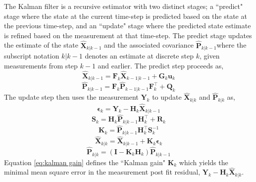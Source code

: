 \documentclass[fleqn,usenatbib,useAMS]{mnras}
\begin{document}
The Kalman filter is a recursive estimator with two distinct stages; a ``predict" stage where the state at the current time-step is predicted based on the state at the previous time-step, and an ``update" stage where the predicted state estimate is refined based on the measurement at that time-step. The predict stage updates the estimate of the state $\hat{\boldsymbol{X}}_{k|k-1}$ and the associated covariance $\hat{\boldsymbol{P}}_{k|k-1}$where the subscript notation ${k|k-1}$ denotes an estimate at discrete step $k$, given measurements from step $k-1$ and earlier. The predict step proceeds as,
\begin{equation}
\hat{\boldsymbol{X}}_{k|k-1} =  \boldsymbol{F}_k \hat{\boldsymbol{X}}_{k-1|k-1} + \boldsymbol{G}_k \boldsymbol{u}_k
\end{equation}
\begin{equation}
	\hat{\boldsymbol{P}}_{k|k-1} =  \boldsymbol{F}_k \hat{\boldsymbol{P}}_{k-1|k-1} \boldsymbol{F}_k^\intercal + \boldsymbol{Q}_k 
\end{equation}
The update step then uses the measurement $\boldsymbol{Y}_k$ to update $\hat{\boldsymbol{X}}_{k|k}$  and $\hat{\boldsymbol{P}}_{k|k}$ as,
\begin{equation}
	\boldsymbol{\epsilon}_{k} = \boldsymbol{Y}_k - \boldsymbol{H}_k \hat{\boldsymbol{X}}_{k|k-1}
\end{equation} 
\begin{equation}
	\boldsymbol{S}_k = \boldsymbol{H}_k \hat{\boldsymbol{P}}_{k|k-1} \boldsymbol{H}_k^\intercal + \boldsymbol{R}_k
\end{equation}
\begin{equation}
	\boldsymbol{K}_k = \hat{\boldsymbol{P}}_{k|k-1} \boldsymbol{H}_k^\intercal \boldsymbol{S}_k^{-1} \label{eq:kalman gain}
\end{equation}
\begin{equation}
	\hat{\boldsymbol{X}}_{k|k} =\hat{\boldsymbol{X}}_{k|k-1} +\boldsymbol{K}_k  \boldsymbol{\epsilon}_{k}
\end{equation}
\begin{equation}
		\hat{\boldsymbol{P}}_{k|k} = \left( \boldsymbol{I} - \boldsymbol{K}_k \boldsymbol{H}_k \right) 	\hat{\boldsymbol{P}}_{k|k-1}
\end{equation}
Equation \ref{eq:kalman gain} defines the ``Kalman gain" $\boldsymbol{K}_k$ which yields the minimal mean square error in the measurement post fit residual, $\boldsymbol{Y}_k - \boldsymbol{H}_k \hat{\boldsymbol{X}}_{k|k}$. \newline 
\end{document}
